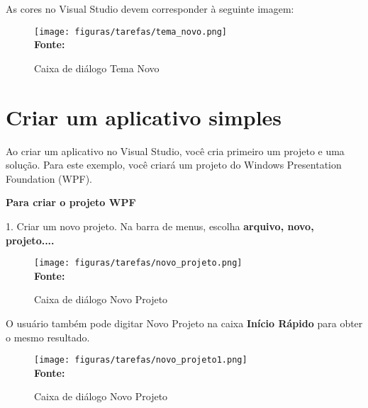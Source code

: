 As cores no Visual Studio devem corresponder à seguinte imagem:

\begin{figure}[ht!]
	\centering	
	\caption[\hspace{-0.1cm} Caixa de diálogo Tema Novo]{Caixa de diálogo Tema Novo}
	\vspace{-0.4cm}
	\texttt{[image: figuras/tarefas/tema\_novo.png]}
	\vspace{-0.2cm}
	\\\textbf{\footnotesize Fonte:~\cite {tutorial_visual:14} }
	\label{fig:tema_novo}
	\vspace{-0.5cm}
\end{figure}

\section{Criar um aplicativo simples}

Ao criar um aplicativo no Visual Studio, você cria primeiro um projeto e uma solução. Para este exemplo, você criará um projeto do Windows Presentation Foundation (WPF). 

\textbf{ Para criar o projeto WPF}

1. Criar um novo projeto. Na barra de menus, escolha \textbf{arquivo, novo, projeto....} 

\begin{figure}[ht!]
	\centering	
	\caption[\hspace{-0.1cm} Caixa de diálogo Novo Projeto]{Caixa de diálogo Novo Projeto}
	\vspace{-0.4cm}
	\texttt{[image: figuras/tarefas/novo\_projeto.png]}
	\vspace{-0.2cm}
	\\\textbf{\footnotesize Fonte:~\cite {tutorial_visual:14} }
	\label{fig:novo_projeto}
	\vspace{-0.5cm}
\end{figure}


O usuário também pode digitar Novo Projeto na caixa \textbf{Início Rápido} para obter o mesmo resultado.

\begin{figure}[ht!]
	\centering	
	\caption[\hspace{-0.1cm} Caixa de diálogo Novo Projeto]{Caixa de diálogo Novo Projeto}
	\vspace{-0.4cm}
	\texttt{[image: figuras/tarefas/novo\_projeto1.png]}
	\vspace{-0.2cm}
	\\\textbf{\footnotesize Fonte:~\cite {tutorial_visual:14} }
	\label{fig:novo_projeto1}
	\vspace{-0.5cm}
\end{figure}


